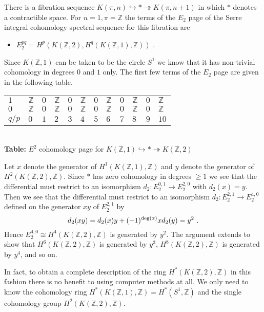 \documentclass[a4paper,11pt]{report}
\begin{document}
{{\begin{Verbatim}[commandchars=!@|,fontsize=\small,frame=single,label=Example]
\end{Verbatim}
 There is a fibration sequence $K(\pi,n) \hookrightarrow \ast \twoheadrightarrow K(\pi,n+1)$ in which $\ast$ denotes a contractible space. For $n=1, \pi=\mathbb Z$ the terms of the $E_2$ page of the Serre integral cohomology spectral sequence for this fibration are 
\begin{itemize}
\item  $E_2^{pq}= H^p( K(\mathbb Z,2), H^q(K(\mathbb Z,1),\mathbb Z) )$ .
\end{itemize}
 Since $K(\mathbb Z,1)$ can be taken to be the circle $S^1$ we know that it has non-trivial cohomology in degrees $0$ and $1$ only. The first few terms of the $E_2$ page are given in the following table. \begin{center}
\begin{tabular}{l|lllllllllll} $1$ &
 $\mathbb Z$ &
 $0$ &
 $\mathbb Z$ &
 $0$ &
 $\mathbb Z$ &
 $0$ &
 $\mathbb Z$ &
 $0$ &
 $\mathbb Z$ &
 $0$ &
 $\mathbb Z$ \\
 $0$ &
 $\mathbb Z$ &
 $0$ &
 $\mathbb Z$ &
 $0$ &
 $\mathbb Z$ &
 $0$ &
 $\mathbb Z$ &
 $0$ &
 $\mathbb Z$ &
 $0$ &
 $\mathbb Z$ \\
 $q/p$ &
 $0$ &
 $1$ &
 $2$ &
 $3$ &
 $4$ &
 $5$ &
 $6$ &
 $7$ &
 $8$ &
 $9$ &
 $10$ \\
\end{tabular}\\[2mm]
\textbf{Table: }$E^2$ cohomology page for $K(\mathbb Z,1) \hookrightarrow \ast \twoheadrightarrow K(\mathbb Z,2)$\end{center}

 Let $x$ denote the generator of $H^1(K(\mathbb Z,1),\mathbb Z)$ and $y$ denote the generator of $H^2(K(\mathbb Z,2),\mathbb Z)$. Since $\ast$ has zero cohomology in degrees $\ge 1$ we see that the differential must restrict to an isomorphism $d_2\colon E_2^{0,1} \rightarrow E_2^{2,0}$ with $d_2(x)=y$. Then we see that the differential must restrict to an isomorphism $d_2\colon E_2^{2,1} \rightarrow E_2^{4,0}$ defined on the generator $xy$ of $E_2^{2,1}$ by 
\[d_2(xy) = d_2(x)y + (-1)^{{\rm deg}(x)}xd_2(y) =y^2\ . \]
 Hence $E_2^{4,0} \cong H^4(K(\mathbb Z,2),\mathbb Z)$ is generated by $y^2$. The argument extends to show that $H^6(K(\mathbb Z,2),\mathbb Z)$ is generated by $y^3$, $H^8(K(\mathbb Z,2),\mathbb Z)$ is generated by $y^4$, and so on. 

In fact, to obtain a complete description of the ring $H^\ast(K(\mathbb Z,2),\mathbb Z)$ in this fashion there is no benefit to using computer methods at all. We only
need to know the cohomology ring $H^\ast(K(\mathbb Z,1),\mathbb Z) =H^\ast(S^1,\mathbb Z)$ and the single cohomology group $H^2(K(\mathbb Z,2),\mathbb Z)$. 

}}
\end{document}
